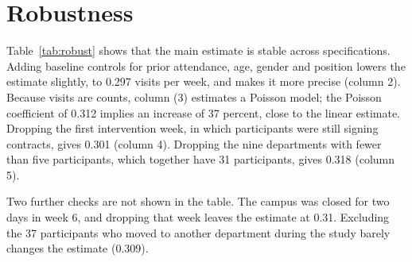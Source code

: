 \section{Robustness}
\label{sec:robustness}
Table~\ref{tab:robust} shows that the main estimate is stable across specifications. Adding baseline controls for prior attendance, age, gender and position lowers the estimate slightly, to 0.297 visits per week, and makes it more precise (column 2). Because visits are counts, column (3) estimates a Poisson model; the Poisson coefficient of 0.312 implies an increase of 37 percent, close to the linear estimate. Dropping the first intervention week, in which participants were still signing contracts, gives 0.301 (column 4). Dropping the nine departments with fewer than five participants, which together have 31 participants, gives 0.318 (column 5).

Two further checks are not shown in the table. The campus was closed for two days in week 6, and dropping that week leaves the estimate at 0.31. Excluding the 37 participants who moved to another department during the study barely changes the estimate (0.309).



